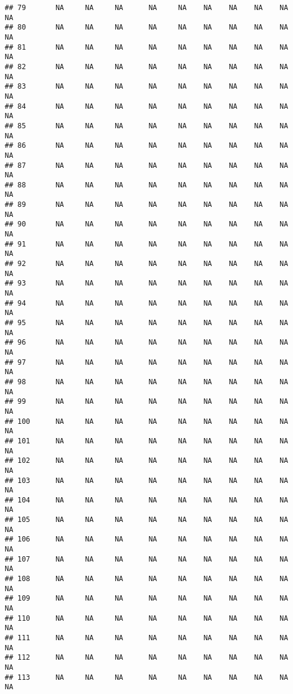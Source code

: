 \documentclass{article}\usepackage{graphicx, color}
\makeatletter
\newenvironment{kframe}{%
 \def\at@end@of@kframe{}%
 \ifinner\ifhmode%
  \def\at@end@of@kframe{\end{minipage}}%
  \begin{minipage}{\columnwidth}%
 \fi\fi%
 \def\FrameCommand##1{\hskip\@totalleftmargin \hskip-\fboxsep
 \colorbox{shadecolor}{##1}\hskip-\fboxsep
     \hskip-\linewidth \hskip-\@totalleftmargin \hskip\columnwidth}%
 \MakeFramed {\advance\hsize-\width
   \@totalleftmargin\z@ \linewidth\hsize
   \@setminipage}}%
 {\par\unskip\endMakeFramed%
 \at@end@of@kframe}
\newenvironment{knitrout}{}{} %
\makeatother
\begin{document}
\begin{knitrout}
\begin{kframe}
\begin{verbatim}
## 79       NA     NA     NA      NA     NA    NA    NA    NA    NA     NA
## 80       NA     NA     NA      NA     NA    NA    NA    NA    NA     NA
## 81       NA     NA     NA      NA     NA    NA    NA    NA    NA     NA
## 82       NA     NA     NA      NA     NA    NA    NA    NA    NA     NA
## 83       NA     NA     NA      NA     NA    NA    NA    NA    NA     NA
## 84       NA     NA     NA      NA     NA    NA    NA    NA    NA     NA
## 85       NA     NA     NA      NA     NA    NA    NA    NA    NA     NA
## 86       NA     NA     NA      NA     NA    NA    NA    NA    NA     NA
## 87       NA     NA     NA      NA     NA    NA    NA    NA    NA     NA
## 88       NA     NA     NA      NA     NA    NA    NA    NA    NA     NA
## 89       NA     NA     NA      NA     NA    NA    NA    NA    NA     NA
## 90       NA     NA     NA      NA     NA    NA    NA    NA    NA     NA
## 91       NA     NA     NA      NA     NA    NA    NA    NA    NA     NA
## 92       NA     NA     NA      NA     NA    NA    NA    NA    NA     NA
## 93       NA     NA     NA      NA     NA    NA    NA    NA    NA     NA
## 94       NA     NA     NA      NA     NA    NA    NA    NA    NA     NA
## 95       NA     NA     NA      NA     NA    NA    NA    NA    NA     NA
## 96       NA     NA     NA      NA     NA    NA    NA    NA    NA     NA
## 97       NA     NA     NA      NA     NA    NA    NA    NA    NA     NA
## 98       NA     NA     NA      NA     NA    NA    NA    NA    NA     NA
## 99       NA     NA     NA      NA     NA    NA    NA    NA    NA     NA
## 100      NA     NA     NA      NA     NA    NA    NA    NA    NA     NA
## 101      NA     NA     NA      NA     NA    NA    NA    NA    NA     NA
## 102      NA     NA     NA      NA     NA    NA    NA    NA    NA     NA
## 103      NA     NA     NA      NA     NA    NA    NA    NA    NA     NA
## 104      NA     NA     NA      NA     NA    NA    NA    NA    NA     NA
## 105      NA     NA     NA      NA     NA    NA    NA    NA    NA     NA
## 106      NA     NA     NA      NA     NA    NA    NA    NA    NA     NA
## 107      NA     NA     NA      NA     NA    NA    NA    NA    NA     NA
## 108      NA     NA     NA      NA     NA    NA    NA    NA    NA     NA
## 109      NA     NA     NA      NA     NA    NA    NA    NA    NA     NA
## 110      NA     NA     NA      NA     NA    NA    NA    NA    NA     NA
## 111      NA     NA     NA      NA     NA    NA    NA    NA    NA     NA
## 112      NA     NA     NA      NA     NA    NA    NA    NA    NA     NA
## 113      NA     NA     NA      NA     NA    NA    NA    NA    NA     NA

\end{verbatim}
\end{kframe}
\end{knitrout}
\end{document}
